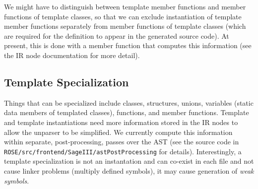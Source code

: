    We might have to distinguish between template member functions and member functions
   of template classes, so that we can exclude instantiation of template member functions
   separately from member functions of template classes (which are required for the
   definition to appear in the generated source code).  At present, this is done with a
   member function that computes this information (see the IR node documentation for more detail).


\subsection{Template Specialization}
   Things that can be specialized include classes, structures, unions,
variables (static data members of templated classes), functions, and member functions.
   Template and template instantiations need more information stored in the IR nodes to
allow the unparser to be simplified.  We currently compute this information within
separate, post-processing, passes over the AST (see the source code in
{\tt ROSE/src/frontend/SageIII/astPostProcessing} for details).
   Interestingly, a template specialization is not an instantation and can co-exist in each
file and not cause linker problems (multiply defined symbols), it may cause generation of 
{\em weak symbols}.


